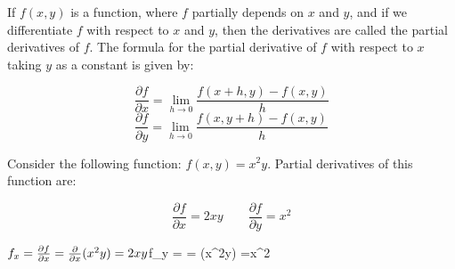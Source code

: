 \documentclass{article}
\begin{document}
If $f(x, y)$ is a function, where $f$ partially depends on $x$ and $y$, and if we differentiate $f$ with respect to $x$ and $y$, then the derivatives are called the partial derivatives of $f$. The formula for the partial derivative of $f$ with respect to $x$ taking $y$ as a constant is given by:

\[
\frac{{\partial f}}{{\partial x}} = \lim_{{h \to 0}} \frac{{f(x + h, y) - f(x, y)}}{h}
\]
\newline
\[
\frac{{\partial f}}{{\partial y}} = \lim_{{h \to 0}} \frac{{f(x, y+h) - f(x, y)}}{h}
\]

Consider the following function: $f(x,y) = x^2y$. Partial derivatives of this function are:

\[
\frac{{\partial f}}{{\partial x}} = 2xy \quad \quad \frac{{\partial f}}{{\partial y}} = x^2
\]

\newline
$f_x = \frac{{\partial f}}{{\partial x}}
\newline
     = \frac{{\partial}}{{\partial x}} (x^2y)
\newline
    =2xy
\newline
$f_y = 
\newline
\tab     =  (x^2y)
\newline
    =x^2
\end{document}
